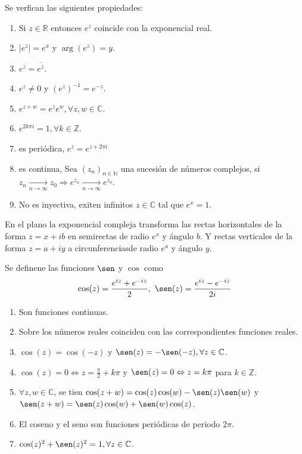 \begin{prop}
  Se verfican las siguientes propiedades:
  \begin{enumerate}[label=(\roman*)]
    \item Si $z \in \mathbb{R}$ entonces $e^z$ coincide con la exponencial real.
    \item $ |e^{z}| = e^{x}$ y $\arg(e^{z}) = y$.
    \item $e^{\overline{z}} = \overline{e^{\overline{z}}}$.
    \item  $e^{z} \neq 0$ y $ (e^{z})^{-1} = e^{-z}$.
    \item $e^{z+w} =  e^{z}e^{w}, \forall z,w \in \mathbb{C}$.
    \item $e^{2k\pi i} = 1, \forall k \in \mathbb{Z}$.
    \item es periódica, $e^{z} = e^{z + 2\pi i}$
    \item es continua, Sea $(z_{n})_{n \in \mathbb{N}}$ una sucesión de números complejos, si $z_{n} \xrightarrow[n \rightarrow \infty]{} z_{0} \Rightarrow e^{z_{n}} \xrightarrow[n \rightarrow \infty]{} e^{z_{0}}$.
    \item  No es inyectiva, exiten infinitos $z \in \mathbb{C}$ tal que $ e^{x} = 1$.
  \end{enumerate}
\end{prop}

\begin{obs}
  En el plano la exponencial compleja transforma las rectas horizontales de la forma $z = x + ib$ en semirectas de radio $e^{x}$ y ángulo $b$. Y rectas verticales de la forma $z = a + iy$ a circunferenciasde radio $e^{a}$ y ángulo $y$.
\end{obs}

\begin{defn}
  Se definene las funciones $\sen $ y $\cos$ como \[ \cos(z) = \frac{e^{iz} + e^{-iz}}{2}, \ \sen(z) = \frac{e^{iz} -  e^{-iz}}{2i} \] 
\end{defn}

\begin{prop}
  \begin{enumerate}[label=(\roman*)]
    \item Son funciones continuas.
    \item Sobre los números reales coinciden con las correspondientes funciones reales.
    \item $\cos(z) = \cos(-z)$ y $\sen(z) = -\sen(-z), \forall z \in \mathbb{C}$.
    \item  $\cos(z) = 0 \Leftrightarrow z = \frac{\pi}{2} + k \pi$ y $\sen(z) = 0 \Leftrightarrow z = k \pi$ para $k \in \mathbb{Z}$.
    \item $\forall z,w \in \mathbb{C}$, se tien $ \cos(z+w)= \cos(z)\cos(w) -\sen(z)\sen(w)$ y $ \sen(z+w)=\sen(z)\cos(w) + \sen(w)\cos(z)$.
    \item El coseno y el seno son funciones periódicas de periodo $2\pi$.
    \item $\cos(z)^{2} + \sen(z)^{2} = 1, \forall z \in \mathbb{C}$.
  \end{enumerate}
\end{prop}

